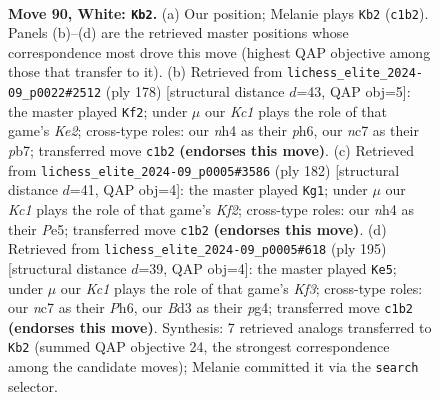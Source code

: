 \documentclass[11pt]{article}
\begin{document}
\clearpage

\begin{figure}[p]\centering
\begin{subfigure}{0.46\textwidth}\centering
\resizebox{\linewidth}{!}{%
\newchessgame
\chessboard[
  setfen={5k2/1Nn5/8/p7/Pb1pP2n/1P1B3p/4P3/2K5 w - - 46 90},
  showmover=false,
  pgfstyle=straightmove, color=movearrow, markmove={c1-b2}
]}
\caption{}
\end{subfigure}\hfill
\begin{subfigure}{0.46\textwidth}\centering
\resizebox{\linewidth}{!}{%
\newchessgame
\chessboard[
  setfen={6k1/1p6/2pB3p/2P3pP/1Pb3P1/8/4K3/8 w - - 11 90},
  showmover=false,
  pgfstyle=straightmove, color=movearrow, markmove={e2-f2}
]}
\caption{}
\end{subfigure}
\\[4pt]
\begin{subfigure}{0.46\textwidth}\centering
\resizebox{\linewidth}{!}{%
\newchessgame
\chessboard[
  setfen={8/5k2/p3p3/Pb2P1Bp/1P5P/8/5K2/8 w - - 64 92},
  showmover=false,
  pgfstyle=straightmove, color=movearrow, markmove={f2-g1}
]}
\caption{}
\end{subfigure}\hfill
\begin{subfigure}{0.46\textwidth}\centering
\resizebox{\linewidth}{!}{%
\newchessgame
\chessboard[
  setfen={8/8/2K2k1p/p1p3p1/Pb4P1/1B2PP2/8/8 b - - 43 98},
  showmover=false,
  pgfstyle=straightmove, color=movearrow, markmove={f6-e5}
]}
\caption{}
\end{subfigure}
\caption{\textbf{Move 90, White: \texttt{Kb2}.} (a) Our position; Melanie plays \texttt{Kb2} (\texttt{c1b2}). Panels (b)--(d) are the retrieved master positions whose correspondence most drove this move (highest QAP objective among those that transfer to it). (b) Retrieved from \texttt{lichess\_elite\_2024-09\_p0022\#2512} (ply 178) [structural distance $d$=43, QAP obj=5]: the master played \texttt{Kf2}; under $\mu$ our \emph{Kc1} plays the role of that game's \emph{Ke2}; cross-type roles: our \emph{n}h4 as their \emph{p}h6, our \emph{n}c7 as their \emph{p}b7; transferred move \texttt{c1b2} \textbf{(endorses this move)}. (c) Retrieved from \texttt{lichess\_elite\_2024-09\_p0005\#3586} (ply 182) [structural distance $d$=41, QAP obj=4]: the master played \texttt{Kg1}; under $\mu$ our \emph{Kc1} plays the role of that game's \emph{Kf2}; cross-type roles: our \emph{n}h4 as their \emph{P}e5; transferred move \texttt{c1b2} \textbf{(endorses this move)}. (d) Retrieved from \texttt{lichess\_elite\_2024-09\_p0005\#618} (ply 195) [structural distance $d$=39, QAP obj=4]: the master played \texttt{Ke5}; under $\mu$ our \emph{Kc1} plays the role of that game's \emph{Kf3}; cross-type roles: our \emph{n}c7 as their \emph{P}h6, our \emph{B}d3 as their \emph{p}g4; transferred move \texttt{c1b2} \textbf{(endorses this move)}. Synthesis: 7 retrieved analogs transferred to \texttt{Kb2} (summed QAP objective 24, the strongest correspondence among the candidate moves); Melanie committed it via the \texttt{search} selector.}
\label{fig:thought-m178}
\end{figure}
\end{document}
